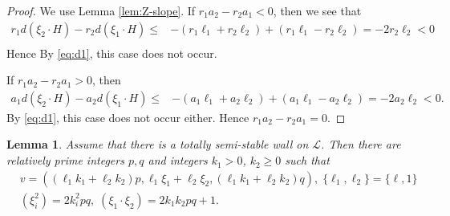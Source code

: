 \documentclass[10pt]{amsart}
\def\cal{\mathcal}
\numberwithin{equation}{section}
\theoremstyle{plain}
\newtheorem{lem}[thm]{Lemma}
\theoremstyle{definition}
\theoremstyle{remark}
\begin{document}
\begin{proof}
We use Lemma \ref{lem:Z-slope}. 
If $r_1 a_2-r_2 a_1<0$, then we see that
\begin{equation}
\begin{split}
r_1 d(\xi_2 \cdot H)-r_2 d (\xi_1 \cdot H)
\leq & -(r_1 \ell_1+r_2 \ell_2)+(r_1 \ell_1-r_2 \ell_2)=-2r_2 \ell_2<0\\
\end{split}
\end{equation}
Hence
By \eqref{eq:d1},
this case does not occur.

If $r_1 a_2-r_2 a_1>0$, then 
\begin{equation}
\begin{split}
a_1 d(\xi_2 \cdot H)-a_2 d (\xi_1 \cdot H)
\leq & -(a_1 \ell_1+a_2 \ell_2)+(a_1 \ell_1-a_2 \ell_2)=-2a_2 \ell_2<0.
\end{split}
\end{equation}
%
By \eqref{eq:d1},
this case does not occur either.
Hence $r_1 a_2-r_2 a_1=0$.
\end{proof}







\begin{lem}\label{lem:tss-L}
Assume that there is a totally semi-stable wall on ${\cal L}$.
Then there are relatively prime integers $p,q$ and integers
$k_1>0$, $k_2 \geq 0$ such that 
\begin{equation}\label{eq:wall-dH}
\begin{split}
&v=((\ell_1 k_1+\ell_2 k_2)p,\ell_1 \xi_1+\ell_2 \xi_2,(\ell_1 k_1+\ell_2 k_2)q),\;\{\ell_1,\ell_2\}=\{\ell,1\}\\
& (\xi_i^2)=2k_i^2 pq,\; (\xi_1 \cdot \xi_2)=2k_1 k_2 pq+1.
\end{split}
\end{equation}
\end{lem}
\end{document}
